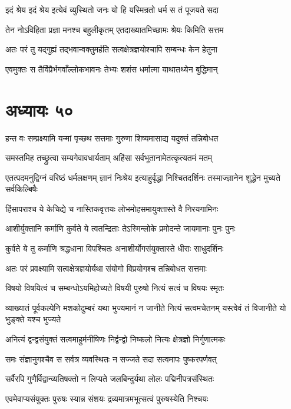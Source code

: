 \twolineshloka
{इदं श्रेय इदं श्रेय इत्येवं व्युस्थितो जनः}
{यो हि यस्मिन्रतो धर्म स तं पूजयते सदा}


\twolineshloka
{तेन नोऽविहिता प्रज्ञा मनश्च बहुलीकृतम्}
{एतदाख्यातमिच्छामः श्रेयः किमिति सत्तम}


\twolineshloka
{अतः परं तु यद्गुह्यं तद्भवान्वक्तुमर्हति}
{सत्वक्षेत्रज्ञयोश्चापि सम्बन्धः केन हेतुना}


\twolineshloka
{एवमुक्तः स तैर्विप्रैर्भगवाँल्लोकभावनः}
{तेभ्यः शशंस धर्मात्मा याथातथ्येन बुद्धिमान्}


\chapter{अध्यायः ५०}
\twolineshloka
{हन्त वः सम्प्रक्ष्यामि यन्मां पृच्छथ सत्तमाः}
{गुरुणा शिष्यमासाद्य यदुक्तं तन्निबोधत}


\twolineshloka
{समस्तमिह तच्छ्रुत्वा सम्यगेवावधार्यताम्}
{अहिंसा सर्वभूतानामेतत्कृत्यतमं मतम्}


\threelineshloka
{एतत्पदमनुद्विग्नं वरिष्ठं धर्मलक्षणम्}
{ज्ञानं निःश्रेय इत्याहुर्वृद्धा निश्चितदर्शिनः}
{तस्माज्ज्ञानेन शुद्धेन मुच्यते सर्वकिल्बिषैः}


\twolineshloka
{हिंसापराश्च ये केचिद्ये च नास्तिकवृत्तयः}
{लोभमोहसमायुक्तास्ते वै निरयगामिनः}


\twolineshloka
{आशीर्युक्तानि कर्माणि कुर्वते ये त्वतन्द्रिताः}
{तेऽस्मिन्लोके प्रमोदन्ते जायमानाः पुनः पुनः}


\twolineshloka
{कुर्वते ये तु कर्माणि श्रद्धधाना विपश्चितः}
{अनाशीर्योगसंयुक्तास्ते धीराः साधुदर्शिनः}


\twolineshloka
{अतः परं प्रवक्ष्यामि सत्वक्षेत्रज्ञयोर्यथा}
{संयोगो विप्रयोगश्च तन्निबोधत सत्तमाः}


\twolineshloka
{विषयो विषयित्वं च सम्बन्धोऽयमिहोच्यते}
{विषयी पुरुषो नित्यं सत्वं च विषयः स्मृतः}


\threelineshloka
{व्याख्यातं पूर्वकल्पेनि मशकोदुम्बरं यथा}
{भुज्यमानं न जानीते नित्यं सत्वमचेतनम्}
{यस्त्वेवं तं विजानीते यो भुङ्क्ते यश्च भुज्यते}


\twolineshloka
{अनित्यं द्वन्द्वसंयुक्तं सत्वमाहुर्मनीषिणः}
{निर्द्वन्द्वो निष्कलो नित्यः क्षेत्रज्ञो निर्गुणात्मकः}


\twolineshloka
{समः संज्ञानुगश्चैव स सर्वत्र व्यवस्थितः}
{न सज्जते सदा सत्वमापः पुष्करपर्णवत्}


\twolineshloka
{सर्वैरपि गुणैर्विद्वान्व्यतिषक्तो न लिप्यते}
{जलबिन्दुर्यथा लोलः पद्मिनीपत्रसंस्थितः}


\twolineshloka
{एवमेवाप्यसंयुक्तः पुरुषः स्यान्न संशयः}
{द्रव्यमात्रमभूत्सत्वं पुरुषस्येति निश्चयः}


